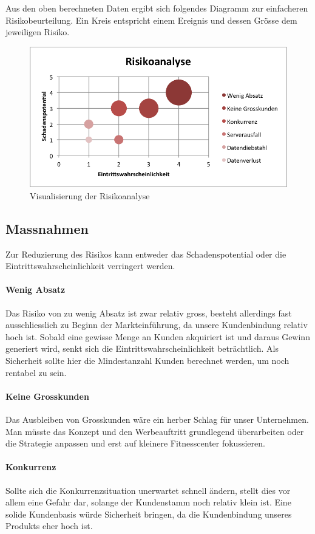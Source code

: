 Aus den oben berechneten Daten ergibt sich folgendes Diagramm zur einfacheren Risikobeurteilung. Ein Kreis entspricht einem Ereignis und dessen Grösse dem jeweiligen Risiko.
\begin{figure}[H]
	\centering
	\includegraphics[width=0.5\linewidth]{images/risikoanalyse}
	\caption{Visualisierung der Risikoanalyse}
	\label{fig:visualisierung-risikoanalyse}
\end{figure}

\subsection{Massnahmen}
Zur Reduzierung des Risikos kann entweder das Schadenspotential oder die Eintrittswahrscheinlichkeit verringert werden.
\paragraph{Wenig Absatz}
Das Risiko von zu wenig Absatz ist zwar relativ gross, besteht allerdings fast ausschliesslich zu Beginn der Markteinführung, da unsere Kundenbindung relativ hoch ist. Sobald eine gewisse Menge an Kunden akquiriert ist und daraus Gewinn generiert wird, senkt sich die Eintrittswahrscheinlichkeit beträchtlich. Als Sicherheit sollte hier die Mindestanzahl Kunden berechnet werden, um noch rentabel zu sein. 
\paragraph{Keine Grosskunden}
Das Ausbleiben von Grosskunden wäre ein herber Schlag für unser Unternehmen. Man müsste das Konzept und den Werbeauftritt grundlegend überarbeiten oder die Strategie anpassen und erst auf kleinere Fitnesscenter fokussieren.
\paragraph{Konkurrenz}
Sollte sich die Konkurrenzsituation unerwartet schnell ändern, stellt dies vor allem eine Gefahr dar, solange der Kundenstamm noch relativ klein ist. Eine solide Kundenbasis würde Sicherheit bringen, da die Kundenbindung unseres Produkts eher hoch ist.
